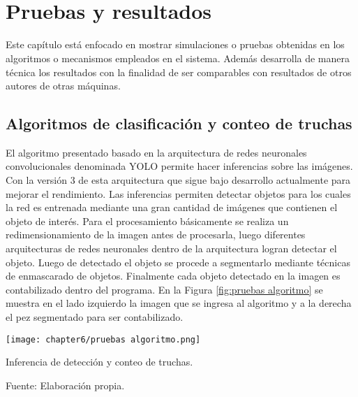 
\pagestyle{myportland}
\doublespacing
\chapter[\quad\quad\quad\quad ----- Pruebas y resultados]{\\ Pruebas y resultados}
\thispagestyle{myportland}

Este capítulo está enfocado en mostrar simulaciones o pruebas obtenidas en los algoritmos o mecanismos empleados en el sistema. Además desarrolla de manera técnica los resultados con la finalidad de ser comparables con resultados de otros autores de otras máquinas.

\section{Algoritmos de clasificación y conteo de truchas}

El algoritmo presentado basado en la arquitectura de redes neuronales convolucionales denominada YOLO permite hacer inferencias sobre las imágenes. Con la versión 3 de esta arquitectura que sigue bajo desarrollo actualmente para mejorar el rendimiento. Las inferencias permiten detectar objetos para los cuales la red es entrenada mediante una gran cantidad de imágenes que contienen el objeto de interés. Para el procesamiento básicamente se realiza un redimensionamiento de la imagen antes de procesarla, luego diferentes arquitecturas de redes neuronales dentro de la arquitectura logran detectar el objeto. Luego de detectado el objeto se procede a segmentarlo mediante técnicas de enmascarado de objetos. Finalmente cada objeto detectado en la imagen es contabilizado dentro del programa. En la Figura \ref{fig:pruebas algoritmo} se muestra en el lado izquierdo la imagen que se ingresa al algoritmo y a la derecha el pez segmentado para ser contabilizado.

\begin{myfigure}[H]
	\footnotesize\centering
	\texttt{[image: chapter6/pruebas algoritmo.png]}
	\caption{Inferencia de detección y conteo de truchas.}
	\begin{myflushcenter}
		Fuente: Elaboración propia.
	\end{myflushcenter}
	\label{fig:pruebas algoritmo}
\end{myfigure}

